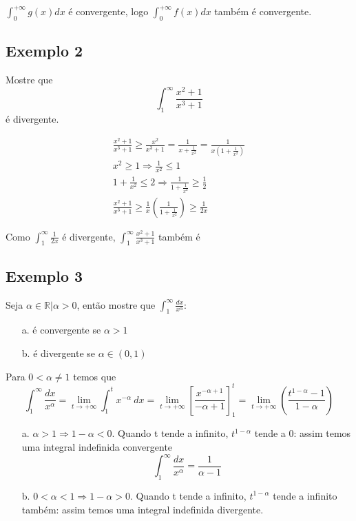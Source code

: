 \documentclass[12pt,openany]{book}
\begin{document}
$\displaystyle{\int_0^{+\infty}g(x)dx }$ é convergente, logo $\displaystyle{\int_0^{+\infty}f(x)dx }$ também  é convergente.

\subsection{Exemplo 2}
\label{sub:ex142}

Mostre que $$ \int_1^{\infty} \frac{x^2+1}{x^3+1} $$ é divergente.

\begin{align}
\frac{x^2+1}{x^3+1} \geq \frac{x^2}{x^3+1} = \frac{1}{x+\frac{1}{x^2}} = \frac{1}{x(1+\frac{1}{x^2})}\\
x^2 \geq 1 \Rightarrow \frac{1}{x^2} \leq 1 \\
1 + \frac{1}{x^2} \leq 2 \Rightarrow \frac{1}{1+\frac{1}{x^2}} \geq \frac{1}{2}\\
\frac{x^2+1}{x^3+1} \geq \frac{1}{x}\left(\frac{1}{1+\frac{1}{x^2}}\right) \geq \frac{1}{2x}
\end{align}

Como $ \displaystyle{\int_1^{\infty} \frac{1}{2x}} $ é divergente, $\displaystyle{ \int_1^{\infty} \frac{x^2+1}{x^3+1}} $ também é

\subsection{Exemplo 3}
\label{sub:ex143}

\hspace{5mm}Seja $\alpha \in \mathds{R} | \alpha >0 $, então mostre que $\displaystyle{\int_1^\infty \frac{dx}{x^\alpha}} $:
\begin{enumerate}
\item [a.] é convergente se $\alpha > 1$\\
\item [b.] é divergente se $\alpha \in (0,1) $
\end{enumerate}

Para $0  < \alpha \neq 1$ temos que $$\displaystyle{\int_1^\infty \frac{dx}{x^\alpha} = \lim_{t \rightarrow +\infty} \int_1^t x^{-\alpha}\ dx = \lim_{t \rightarrow +\infty} \left[ \frac{x^{-\alpha + 1}}{-\alpha + 1}\right]_1^t = \lim_{t \rightarrow +\infty} \left( \frac{t^{1-\alpha}-1}{1-\alpha}\right)}$$

\begin{enumerate}
\item [a.] $\alpha > 1 \Rightarrow 1 - \alpha < 0$. Quando t tende a infinito, $t^{1-\alpha}$ tende a 0: assim temos uma integral indefinida convergente $$\displaystyle{\int_1^\infty \frac{dx}{x^\alpha}} = \frac{1}{\alpha - 1}$$
\item [b.] $0 < \alpha < 1 \Rightarrow 1 - \alpha > 0$. Quando t tende a infinito, $t^{1-\alpha}$ tende a infinito também: assim temos uma integral indefinida divergente.
\end{enumerate}
\end{document}
